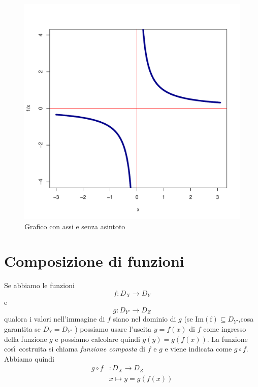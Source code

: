 \documentclass[onecolumn,11pt]{book}\usepackage[]{graphicx}\usepackage[]{color}
\makeatletter
\def\maxwidth{ %
  \ifdim\Gin@nat@width>\linewidth
    \linewidth
  \else
    \Gin@nat@width
  \fi
}
\newenvironment{knitrout}{}{} %
\makeatother
\begin{document}
\begin{itemize}
\begin{itemize}
\begin{figure}[ htbp]
\begin{center}
\begin{knitrout}
\color{fgcolor}
\includegraphics[width=\maxwidth]{figure/unnamed-chunk-93-1} 

\end{knitrout}
\caption{Grafico con assi e senza asintoto}
\label{fig:noasint}
\end{center}
\end{figure}
\end{itemize}
\end{itemize}


\section{Composizione di funzioni}
Se abbiamo  le funzioni
\[f\colon D_X   \rightarrow D_Y\]
e
\[g\colon D_{Y'}   \rightarrow D_Z\]
qualora i valori nell'immagine di $f$ siano nel dominio di $g$  (se $\mathrm{Im(f)}  \subseteq D_{Y'}$,cosa garantita se $D_Y=D_{Y'}$ ) possiamo usare l'uscita $y=f(x)$ di $f $ come ingresso della funzione $g$ e possiamo calcolare quindi
 $g(y)=g(f(x))$.
La funzione cos\'\i~costruita si chiama \emph{funzione composta} di $f$ e $g$ e viene indicata come
 $g\circ f$.
 Abbiamo quindi
 \begin{align*} g\circ f&\colon D_X\rightarrow D_Z\\
 &x\mapsto y=g(f(x))\end{align*}
\end{document}
